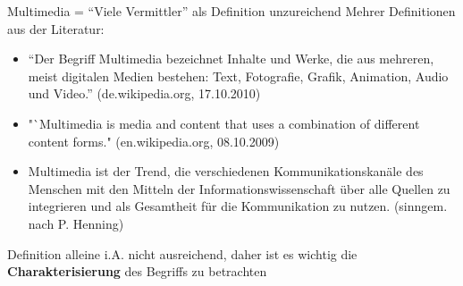    \begin{bsslide}
     Multimedia = "`Viele Vermittler"' als Definition unzureichend 
     Mehrer Definitionen aus der Literatur:
     \begin{itemize}
       \item "`Der Begriff Multimedia bezeichnet Inhalte und Werke, die aus mehreren, meist digitalen Medien bestehen: Text, Fotografie, Grafik, Animation, Audio und Video."' (de.wikipedia.org, 17.10.2010)
       \item "`Multimedia is media and content that uses a combination of different content forms." (en.wikipedia.org, 08.10.2009)
       \item Multimedia ist der Trend, die verschiedenen Kommunikationskan\"ale des Menschen mit den Mitteln der Informationswissenschaft \"uber alle Quellen zu integrieren und als Gesamtheit f\"ur die Kommunikation zu nutzen. (sinngem. nach P. Henning) 
     \end{itemize}
     Definition alleine i.A. nicht ausreichend, daher ist es wichtig die \textbf{Charakterisierung} des Begriffs zu betrachten
  \end{bsslide}
  
